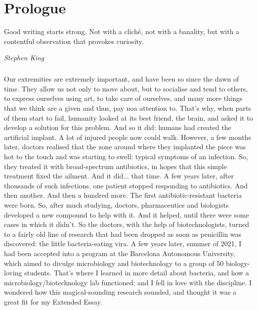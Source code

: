 \chapter{Prologue}
\epigraph{Good writing starts strong. Not with a cliché, not with a banality, but with a contentful observation that provokes curiosity.}{\textit{Stephen King}}
\paragraph{}Our extremities are extremely important, and have been so since the dawn of time. They allow us not only to move about, but to socialise and tend to others, to express ourselves using art, to take care of ourselves, and many more things that we think are a given and thus, pay noa attention to. That's why, when parts  of them start to fail, humanity looked at its best friend, the brain, and asked it to develop a solution for this problem. And so it did: humans had created the artificial implant. A lot of injured people now could walk. However, a few months later, doctors realised that the zone around where they implanted the piece was hot to the touch and was starting to swell: typical symptoms of an infection. So, they treated it with broad-spectrum antibiotics, in hopes that this simple treatment fixed the ailment. And it did... that time. A few years later, after thousands of such infections, one patient stopped responding to antibiotics. And then another. And then a hundred more. The first antibiotic-resistant bacteria were born. So, after much studying, doctors, pharmaceutics and biologists developed a new compound to help with it. And it helped, until there were some cases in which it didn't. So the doctors, with the help of biotechnologists, turned to a fairly old line of research that had been dropped as soon as penicillin was discovered: the little bacteria-eating vira.\newline
A few years later, summer of 2021, I had been accepted into a program at the Barcelona Autonomous University, which aimed to divulge microbiology and biotechnology to a group of 50 biology-loving students. That's where I learned in more detail about bacteria, and how a microbiology/biotechnology lab functioned; and I fell in love with the discipline. I wondered how this magical-sounding research sounded, and thought it was a great fit for my Extended Essay.

